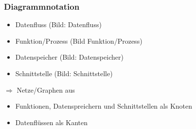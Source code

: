 \documentclass[10pt,a4paper]{book}
\begin{document}
\subsubsection*{Diagrammnotation}
\begin{itemize}
  \item Datenfluss (Bild: Datenfluss)
  \item Funktion/Prozess (Bild Funktion/Prozess)
  \item Datenspeicher (Bild: Datenspeicher)
  \item Schnittstelle (Bild: Schnittstelle)
\end{itemize}
$\Rightarrow$ Netze/Graphen aus
\begin{itemize}
  \item Funktionen, Datenspreichern und Schnittstellen als Knoten
  \item Datenflüssen als Kanten
\end{itemize}
\end{document}
